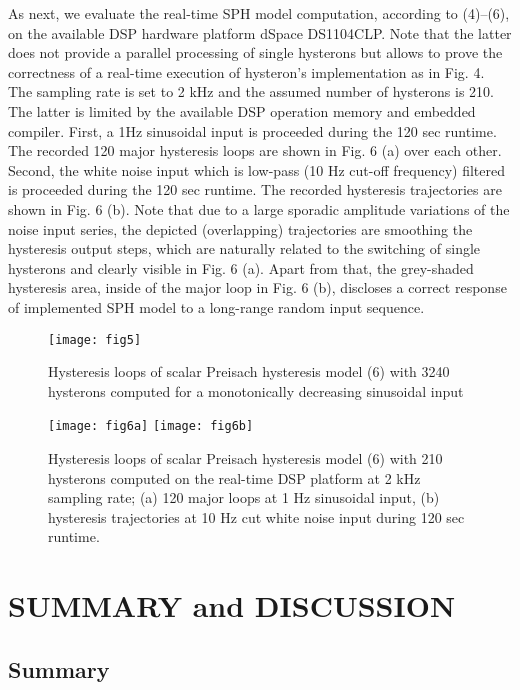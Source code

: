 \documentclass[journal]{IEEEtran}
\begin{document}
As next, we evaluate the real-time SPH model computation,
according to (4)--(6), on the available DSP hardware platform
dSpace DS1104CLP. Note that the latter does not provide a parallel
processing of single hysterons but allows to prove the correctness
of a real-time execution of hysteron's implementation as in Fig.
4. The sampling rate is set to 2 kHz and the assumed number of
hysterons is 210. The latter is limited by the available DSP
operation memory and embedded compiler. First, a 1Hz sinusoidal
input is proceeded during the 120 sec runtime. The recorded 120
major hysteresis loops are shown in Fig. 6 (a) over each other.
Second, the white noise input which is low-pass (10 Hz cut-off
frequency) filtered is proceeded during the 120 sec runtime. The
recorded hysteresis trajectories are shown in Fig. 6 (b). Note
that due to a large sporadic amplitude variations of the noise
input series, the depicted (overlapping) trajectories are
smoothing the hysteresis output steps, which are naturally related
to the switching of single hysterons and clearly visible in Fig. 6
(a). Apart from that, the grey-shaded hysteresis area, inside of
the major loop in Fig. 6 (b), discloses a correct response of
implemented SPH model to a long-range random input sequence.
\begin{figure}[!h]
\centering
\texttt{[image: fig5]}
\caption{Hysteresis loops of scalar Preisach hysteresis model (6)
with 3240 hysterons computed for a monotonically decreasing
sinusoidal input} \label{fig:5}
\end{figure}
\begin{figure}[!h]
\centering
\texttt{[image: fig6a]}
\texttt{[image: fig6b]}
\caption{Hysteresis loops of scalar Preisach hysteresis model (6)
with 210 hysterons computed on the real-time DSP platform at 2 kHz
sampling rate; (a) 120 major loops at 1 Hz sinusoidal input, (b)
hysteresis trajectories at 10 Hz cut white noise input during 120
sec runtime.} \label{fig:6}
\end{figure}



\section{SUMMARY and DISCUSSION}
\label{sec:4}

\subsection{Summary}
\end{document}
